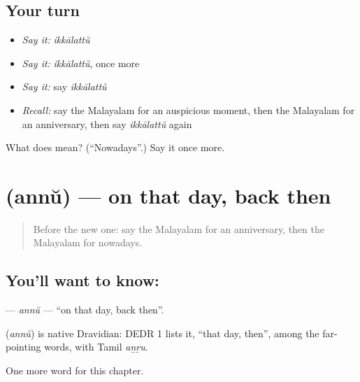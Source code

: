 \subsection*{Your turn}
\begin{itemize}
\raggedright
  \item \emph{Say it:} \emph{ikkālattŭ}
  \item \emph{Say it:} \emph{ikkālattŭ}, once more
  \item \emph{Say it:} say \emph{ikkālattŭ}
  \item \emph{Recall:} say the Malayalam for an auspicious moment, then the Malayalam for an anniversary, then say \emph{ikkālattŭ} again
\end{itemize}

\begin{tcolorbox}[breakable,colback=teal!4,colframe=teal!35!black,title={Before you move on}]
What does  mean? (\textquotedblleft{}Nowadays\textquotedblright{}.) Say it once more.
\end{tcolorbox}
\section[\texorpdfstring{\ml{അന്ന്} (annŭ)}{അന്ന് (annŭ)}]{ (annŭ) — on that day, back then}

\label{lesson:ML-C277-annu}



\begin{quote}
Before the new one: say the Malayalam for an anniversary, then the Malayalam for nowadays.
\end{quote}

\subsection*{You'll want to know: }
\textbf{} — \emph{annŭ} — \textquotedblleft{}on that day, back then\textquotedblright{}.

\begin{cousinweb}
\textbf{} (\emph{annŭ}) is native Dravidian: DEDR 1 lists it, \textquotedblleft{}that day, then\textquotedblright{}, among the far-pointing words, with Tamil \emph{aṉṟu}.
\end{cousinweb}

\begin{grammarlens}[title={What you've built}]
One more word for this chapter.
\end{grammarlens}

